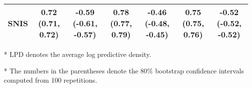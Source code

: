 \begin{table*}
\begin{threeparttable}
\begin{tabular}{lcccccc}
    SNIS & 0.72 {\scriptsize(0.71, 0.72)} & -0.59 {\scriptsize(-0.61, -0.57)} & 0.78 {\scriptsize(0.77, 0.79)} & -0.46 {\scriptsize(-0.48, -0.45)} & 0.75 {\scriptsize(0.75, 0.76)} & -0.52 {\scriptsize(-0.52, -0.52)} \\\bottomrule
  \end{tabular}
  \begin{tablenotes}
    \item[*]{\footnotesize LPD denotes the average log predictive density.}
    \item[*]{\footnotesize The numbers in the parentheses denote the 80\% bootstrap confidence intervals computed from 100 repetitions.}
  \end{tablenotes}
  \end{threeparttable}
  \vspace{-0.05in}
\end{table*}

